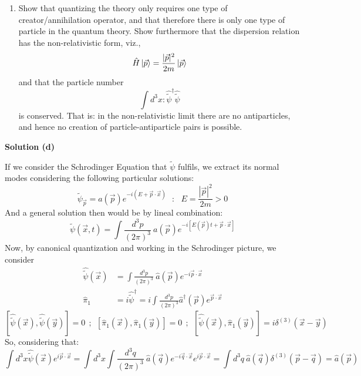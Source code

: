 \documentclass[12pt]{article}
\begin{document}
\color{black}

\begin{enumerate}[label=(\alph*), start = 4]
    \item Show that quantizing the theory only requires one type of creator/annihilation operator, and that therefore there is only one type of particle in the quantum theory. Show furthermore that the dispersion relation has the non-relativistic form, viz.,
        \[
            \hat{H}\ket{\vec{p}}=\frac{|\vec{p}|^2}{2m}\ket{\vec{p}}
        \]
    and that the particle number
        \[
            \int d^3x :\hat{\tilde{\psi}}^\dagger\hat{\tilde{\psi}}
        \]
    is conserved. That is: in the non-relativistic limit there are no antiparticles, and hence no creation of particle-antiparticle pairs is possible.
\end{enumerate}

\color{blue}

\textbf{Solution (d)}

If we consider the Schrodinger Equation that \(\tilde{\psi}\) fulfils, we extract its normal modes considering the following particular solutions:
\[
    \tilde{\psi}_{\vec{p}}=a(\vec{p})e^{-i(E+\vec{p}\cdot\vec{x})} ~~~:~~~E= \frac{|\vec{p}|^2}{2m}>0
\]
And a general solution then would be by lineal combination:
\[
    \tilde{\psi}(\vec{x},t) = \int \frac{d^3p}{(2\pi)^3} ~ a(\vec{p})e^{-i[E(\vec{p})t+\vec{p}\cdot\vec{x}]}
\]
Now, by canonical quantization and working in the Schrodinger picture, we consider
\[
    \begin{aligned}
        \hat{\tilde{\psi}}(\vec{x}) &= \int \frac{d^3p}{(2\pi)^3} ~ \hat{a}(\vec{p})e^{-i\vec{p}\cdot\vec{x}} \\
        \hat{\pi}_1 &= i\hat{\tilde{\psi}}^\dagger=i\int\frac{d^3p}{(2\pi)^3}\hat{a}^\dagger(\vec{p}) e^{\vec{p}\cdot\vec{x}}
    \end{aligned}
\]
\[
    \left[\hat{\tilde{\psi}}(\vec{x}),\hat{\tilde{\psi}}(\vec{y})\right]=0~~;~~\left[\hat{\pi}_1(\vec{x}),\hat{\pi}_1(\vec{y})\right]=0~~;~~\left[\hat{\tilde{\psi}}(\vec{x}),\hat{\pi}_1(\vec{y})\right]=i\delta^{(3)}(\vec{x}-\vec{y})
\]
So, considering that:
\[
    \int d^3x\hat{\tilde{\psi}}(\vec{x})e^{i\vec{p}\cdot\vec{x}}=\int d^3x\int \frac{d^3q}{(2\pi)^3} ~ \hat{a}(\vec{q})e^{-i\vec{q}\cdot\vec{x}}e^{i\vec{p}\cdot\vec{x}}=\int d^3q ~ \hat{a}(\vec{q})\delta^{(3)}(\vec{p}-\vec{q})=\hat{a}(\vec{p})
\]

\newpage
\end{document}
